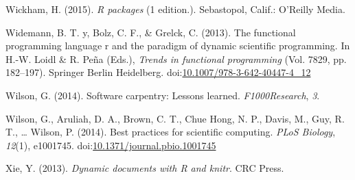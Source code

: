 \documentclass[american,man]{apa6}
\begin{document}
Wickham, H. (2015). \emph{R packages} (1 edition.). Sebastopol, Calif.:
O'Reilly Media.

Widemann, B. T. y, Bolz, C. F., \& Grelck, C. (2013). The functional
programming language r and the paradigm of dynamic scientific
programming. In H.-W. Loidl \& R. Peña (Eds.), \emph{Trends in
functional programming} (Vol. 7829, pp. 182--197). Springer Berlin
Heidelberg.
doi:\href{http://dx.doi.org/10.1007/978-3-642-40447-4_12}{10.1007/978-3-642-40447-4\_12}

Wilson, G. (2014). Software carpentry: Lessons learned.
\emph{F1000Research}, \emph{3}.

Wilson, G., Aruliah, D. A., Brown, C. T., Chue Hong, N. P., Davis, M.,
Guy, R. T., \ldots{} Wilson, P. (2014). Best practices for scientific
computing. \emph{PLoS Biology}, \emph{12}(1), e1001745.
doi:\href{http://dx.doi.org/10.1371/journal.pbio.1001745}{10.1371/journal.pbio.1001745}

Xie, Y. (2013). \emph{Dynamic documents with R and knitr}. CRC Press.
\end{document}
